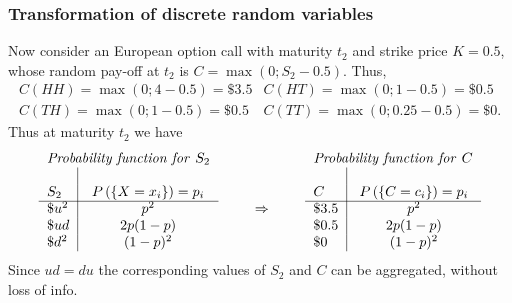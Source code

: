 \documentclass[notes=show,smaller,handout]{beamer}\usepackage[]{graphicx}\usepackage[]{color}
\renewcommand{\Pr}{P}
\begin{document}
\begin{frame}%
\frametitle{Transformation of discrete random variables}
\begin{example}[cont'd]
Now consider an European option call with maturity $t_2$ and strike price $K=0.5$, whose random pay-off at $t_2$ is $C=\max(0;S_2-0.5)$. Thus,
\begin{eqnarray*}
C(HH)=\max(0;4-0.5)=\$ 3.5 & C(HT)=\max(0;1-0.5)=\$ 0.5 \\
C(TH)=\max(0;1-0.5)=\$ 0.5 & C(TT)=\max(0;0.25-0.5)=\$ 0.
\end{eqnarray*}
Thus at maturity $t_2$ we have
\begin{equation*}
\begin{tabular}{l|cll|c}
\multicolumn{2}{l}{\emph{Probability function for }$S_2$} &  &
\multicolumn{2}{l}{\emph{Probability function for }$C$} \\
&  &  &  &  \\
$S_2$ & $\Pr \left(\{ X=x_{i} \}\right) =p_{i}$ &  & $C$ & $\Pr \left(\{
C=c_{i}  \}\right) =p_{i}$ \\ \cline{1-2}\cline{4-5}
$\$ u^2$ & $p^2$ & $\qquad \Rightarrow \qquad $ & $\$ 3.5$ & $p^2$
\\
$\$ ud$ & $2p(1-p)$ &  & $\$ 0.5$ & $2p(1-p)$ \\
$\$ d^2$ & $(1-p)^2$  &  & $\$ 0$ & $(1-p)^2$%
\end{tabular}%
\end{equation*}
\tiny{Since $ud=du$ the corresponding values of $S_2$ and $C$ can be aggregated, without loss of info.}



\end{example}
\end{frame}%
\end{document}
